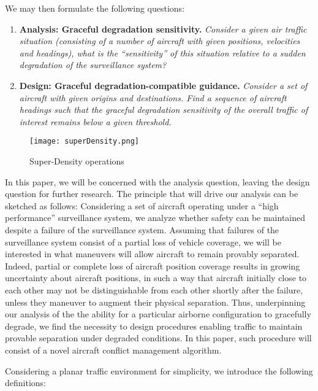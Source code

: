 \documentclass[a4paper, 10pt]{IEEEtran}
\begin{document}
We may then formulate the following questions:

\begin{enumerate}
\item{\bf Analysis: Graceful degradation sensitivity.} \emph{Consider a
given air traffic situation (consisting of a number of aircraft with given
positions, velocities and headings), what is the ``sensitivity'' of this
situation relative to a sudden degradation of the surveillance system? }
\item{\bf Design: Graceful degradation-compatible guidance.} \emph{Consider a set
of aircraft with given origins and destinations. Find a sequence of
aircraft headings such that the graceful degradation sensitivity of the
overall traffic of interest remains below a given threshold.}
\end{enumerate}



\begin{figure}[ht]
\centering
    \texttt{[image: superDensity.png]}
    \caption{Super-Density operations~\cite{nextGen}}
\label{fig:superDensity}
\end{figure}





In this paper, we will be concerned with the analysis question, leaving the
design question for further research. The principle that will drive our
analysis can be sketched as follows: Considering a set of
aircraft operating under a ``high performance'' surveillance system, we
analyze whether safety can be maintained despite a failure of the
surveillance system. Assuming that failures of the surveillance system
consist of a partial loss of vehicle coverage, we will be
interested in what maneuvers will allow aircraft to remain provably
separated. Indeed,  partial or complete loss of aircraft position coverage
results in growing uncertainty about aircraft positions, in such a way that
aircraft initially close to each other may not be distinguishable from each
other shortly after the failure, unless they maneuver to augment their
physical separation. Thus, underpinning our analysis of the the ability for
a particular airborne configuration to gracefully degrade, we find the
necessity to design procedures enabling traffic to maintain provable
separation under degraded conditions. In this paper, such procedure will
consist of a novel aircraft conflict management algorithm.


Considering a planar traffic environment for simplicity, we introduce the following definitions:
\end{document}
